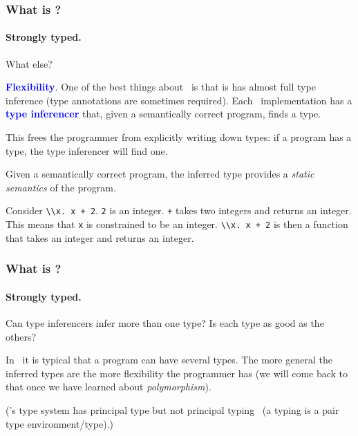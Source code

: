 \documentclass[12pt,red]{beamer}
\newcommand{\cemph}[1]{\textcolor{blue}{\textbf{#1}}}
\begin{document}
\begin{frame}
  \frametitle{What is \ML?}

  \framesubtitle{Strongly typed.}

  What else?

  \vspace{0.1in}

  \cemph{Flexibility}.  One of the best things about \ML\ is that is
  has almost full type inference (type annotations are sometimes
  required).  Each \ML\ implementation has a \cemph{type inferencer}
  that, given a semantically correct program, finds a type.

  \vspace{0.1in}

  This frees the programmer from explicitly writing down types: if a
  program has a type, the type inferencer will find one.

  \vspace{0.1in}

  Given a semantically correct program, the inferred type provides a
  \emph{static semantics} of the program.

  \vspace{0.05in}

  Consider \lstinline{\\x. x + 2}.  \lstinline{2} is an integer.
  \lstinline{+} takes two integers and returns an integer.  This means
  that \lstinline{x} is constrained to be an integer.
  \lstinline{\\x. x + 2} is then a function that takes an integer and
  returns an integer.

\end{frame}


\begin{frame}
  \frametitle{What is \ML?}

  \framesubtitle{Strongly typed.}

  Can type inferencers infer more than one type?  Is each type as good
  as the others?

  \vspace{0.3in}

  In \ML\ it is typical that a program can have several types.  The
  more general the inferred types are the more flexibility the
  programmer has (we will come back to that once we have learned about
  \emph{polymorphism}).

  \vspace{0.3in}

  (\ML's type system has principal type but not principal
  typing~\cite{Wells:2002} (a typing is a pair type
  environment/type).)

\end{frame}
\end{document}
